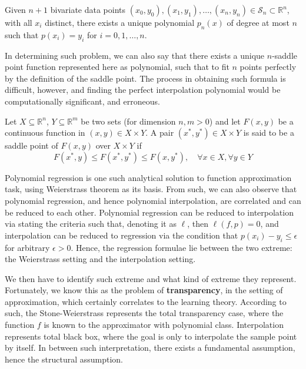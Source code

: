 \documentclass[
  journal=largetwo,
  year=2025,
  volume=37,
]{cup-journal}
\begin{document}
\begin{theorem}
    Given $n+1$ bivariate data points $(x_{0},y_{0}),(x_{1},y_{1}),\dots,(x_{n},y_{n})\in \mathcal{S}_{n}\subset \mathbb{R}^{n}$, with all $x_{i}$ distinct, there exists a unique polynomial $p_{n}(x)$ of degree at most $n$ such that $p(x_{i})=y_{i}$ for $i=0,1,\dots,n$.
\end{theorem}

In determining such problem, we can also say that there exists a unique $n$-saddle point function represented here as polynomial, such that to fit $n$ points perfectly by the definition of the saddle point. The process in obtaining such formula is difficult, however, and finding the perfect interpolation polynomial would be computationally significant, and erroneous. 

\begin{definition}
    Let $X\subseteq \mathbb{R}^{n}$, $Y\subseteq \mathbb{R}^{m}$ be two sets (for dimension $n,m>0$) and let $F(x,y)$ be a continuous function in $(x,y)\in X\times Y$. A pair $(x^{*},y^{*})\in X\times Y$ is said to be a saddle point of $F(x,y)$ over $X\times Y$ if \begin{equation}
        F(x^{*},y) \leq F(x^{*},y^{*})\leq F(x,y^{*}), \quad \forall x\in X, \forall y\in Y
    \end{equation}
\end{definition}

Polynomial regression is one such analytical solution to function approximation task, using Weierstrass theorem as its basis. From such, we can also observe that polynomial regression, and hence polynomial interpolation, are correlated and can be reduced to each other. Polynomial regression can be reduced to interpolation via stating the criteria such that, denoting it as $\ell$, then $\ell(f,p)=0$, and interpolation can be reduced to regression via the condition that $p(x_{i})-y_{i}\leq \epsilon$ for arbitrary $\epsilon>0$. Hence, the regression formulae lie between the two extreme: the Weierstrass setting and the interpolation setting. 

We then have to identify such extreme and what kind of extreme they represent. Fortunately, we know this as the problem of \textbf{transparency}, in the setting of approximation, which certainly correlates to the learning theory. According to such, the Stone-Weierstrass represents the total transparency case, where the function $f$ is known to the approximator with polynomial class. Interpolation represents total black box, where the goal is only to interpolate the sample point by itself. In between such interpretation, there exists a fundamental assumption, hence the structural assumption. 
\end{document}
